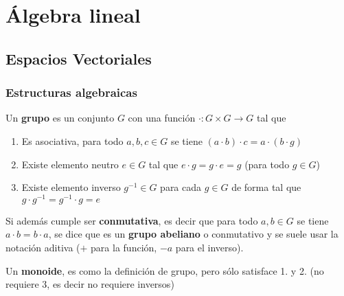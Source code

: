 %
%
%

\part{Álgebra lineal}

\chapter{Espacios Vectoriales}


\section{Estructuras algebraicas}

\begin{definition}
Un \textbf{grupo} es un conjunto $G$ con una función $\cdot : G \times G \to G$ tal que

\begin{enumerate}
\item Es asociativa, para todo $a,b,c \in G$ se tiene
$(a \cdot b) \cdot c = a \cdot (b \cdot g)$

\item Existe elemento neutro $ e \in G$ tal que
$ e \cdot g = g \cdot e = g$ (para todo $ g \in G$)

\item Existe elemento inverso $ g^{-1} \in G$ para cada $ g \in G$ de forma tal que $ g \cdot g^{-1} = g^{-1} \cdot g = e$

\end{enumerate}

Si además cumple ser \textbf{conmutativa}, es decir que para todo $ a,b \in G$ se tiene $ a \cdot b = b \cdot a$, se dice que es un \textbf{grupo abeliano} o conmutativo y se suele usar la notación aditiva ($+$ para la función, $-a$ para el inverso).

Un \textbf{monoide}, es como la definición de grupo, pero sólo satisface 1. y 2. (no requiere 3, es decir no requiere inversos)


\end{definition}


